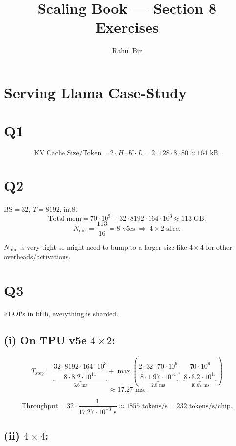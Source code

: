 \documentclass[11pt]{article}
\title{Scaling Book --- Section 8 Exercises}
\author{Rahul Bir}
\date{}
\newcommand{\Tstep}{T_{\text{step}}}
\begin{document}
\maketitle

\section*{Serving Llama Case-Study}

\section*{Q1}

\[
\text{KV Cache Size/Token} = 2 \cdot H \cdot K \cdot L = 2 \cdot 128 \cdot 8 \cdot 80 \approx 164 \text{ kB}.
\]

\section*{Q2}

$\text{BS} = 32$, $T = 8192$, int8.
\[
\text{Total mem} = 70 \cdot 10^9 + 32 \cdot 8192 \cdot 164 \cdot 10^3 \approx 113 \text{ GB}.
\]
\[
N_{\min} = \frac{113}{16} = 8 \text{ v5es} \;\Rightarrow\; 4 \times 2 \text{ slice}.
\]

$N_{\min}$ is very tight so might need to bump to a larger size like $4 \times 4$ for other overheads/activations.

\section*{Q3}

FLOPs in bf16, everything is sharded.

\subsection*{(i) On TPU v5e $4 \times 2$:}

\[
\Tstep = \underbrace{\frac{32 \cdot 8192 \cdot 164 \cdot 10^3}{8 \cdot 8.2 \cdot 10^{11}}}_{6.6 \text{ ms}} + \max\!\left( \underbrace{\frac{2 \cdot 32 \cdot 70 \cdot 10^9}{8 \cdot 1.97 \cdot 10^{14}}}_{2.8 \text{ ms}},\; \underbrace{\frac{70 \cdot 10^9}{8 \cdot 8.2 \cdot 10^{11}}}_{10.67 \text{ ms}} \right)
\]
\[
\approx 17.27 \text{ ms.}
\]

\[
\text{Throughput} = 32 \cdot \frac{1}{17.27 \cdot 10^{-3} \text{ s}} \approx 1855 \text{ tokens/s} = 232 \text{ tokens/s/chip}.
\]

\subsection*{(ii) $4 \times 4$:}
\end{document}
